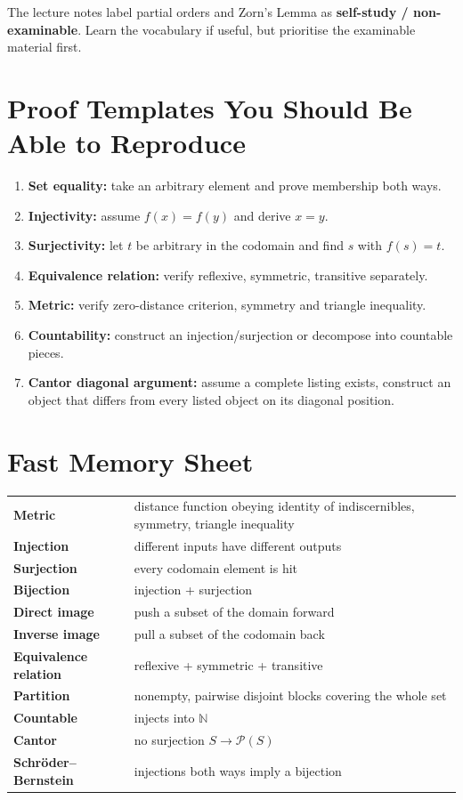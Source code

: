 \documentclass[11pt,a4paper]{article}
\newcommand{\N}{\mathbb{N}}
\newcommand{\PP}{\mathcal{P}}
\begin{document}
\begin{exambox}
The lecture notes label partial orders and Zorn's Lemma as \textbf{self-study / non-examinable}. Learn the vocabulary if useful, but prioritise the examinable material first.
\end{exambox}

\newpage
\section{Proof Templates You Should Be Able to Reproduce}

\begin{enumerate}[label=\textbf{\arabic*.}]
\item \textbf{Set equality:} take an arbitrary element and prove membership both ways.
\item \textbf{Injectivity:} assume $f(x)=f(y)$ and derive $x=y$.
\item \textbf{Surjectivity:} let $t$ be arbitrary in the codomain and find $s$ with $f(s)=t$.
\item \textbf{Equivalence relation:} verify reflexive, symmetric, transitive separately.
\item \textbf{Metric:} verify zero-distance criterion, symmetry and triangle inequality.
\item \textbf{Countability:} construct an injection/surjection or decompose into countable pieces.
\item \textbf{Cantor diagonal argument:} assume a complete listing exists, construct an object that differs from every listed object on its diagonal position.
\end{enumerate}

\section{Fast Memory Sheet}

\begin{center}
\renewcommand{\arraystretch}{1.35}
\begin{tabularx}{\textwidth}{>{\bfseries\color{navy}}p{} X}
Metric & distance function obeying identity of indiscernibles, symmetry, triangle inequality\\
Injection & different inputs have different outputs\\
Surjection & every codomain element is hit\\
Bijection & injection + surjection\\
Direct image & push a subset of the domain forward\\
Inverse image & pull a subset of the codomain back\\
Equivalence relation & reflexive + symmetric + transitive\\
Partition & nonempty, pairwise disjoint blocks covering the whole set\\
Countable & injects into $\N$\\
Cantor & no surjection $S\to\PP(S)$\\
Schr\"oder--Bernstein & injections both ways imply a bijection\\
\end{tabularx}
\end{center}
\end{document}
